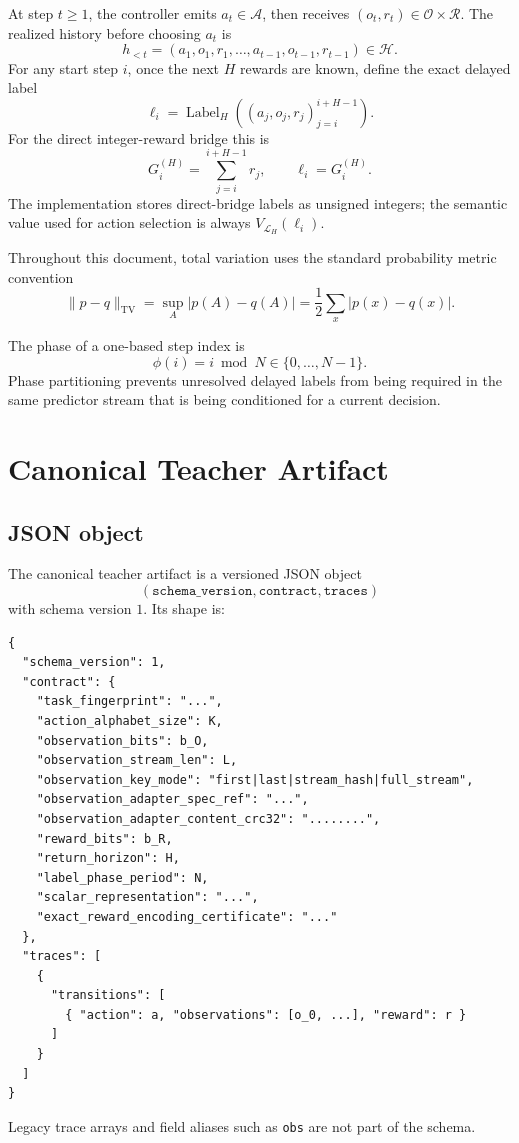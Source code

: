 \documentclass[11pt]{article}
\newcommand{\Act}{\mathcal{A}}
\newcommand{\Ospace}{\mathcal{O}}
\newcommand{\Rspace}{\mathcal{R}}
\newcommand{\Hist}{\mathcal{H}}
\newcommand{\TV}{\mathrm{TV}}
\newcommand{\Lab}{\mathcal{L}_H}
\newcommand{\Vlab}{V_{\Lab}}
\begin{document}
At step \(t\ge1\), the controller emits \(a_t\in\Act\), then receives
\((o_t,r_t)\in\Ospace\times\Rspace\). The realized history before choosing
\(a_t\) is
\[
h_{<t}=(a_1,o_1,r_1,\dots,a_{t-1},o_{t-1},r_{t-1})\in\Hist.
\]
For any start step \(i\), once the next \(H\) rewards are known, define the
exact delayed label
\[
\ell_i=\operatorname{Label}_H((a_j,o_j,r_j)_{j=i}^{i+H-1}).
\]
For the direct integer-reward bridge this is
\[
G_i^{(H)}=\sum_{j=i}^{i+H-1}r_j,
\qquad
\ell_i=G_i^{(H)}.
\]
The implementation stores direct-bridge labels as unsigned integers; the semantic value
used for action selection is always \(\Vlab(\ell_i)\).

Throughout this document, total variation uses the standard probability
metric convention
\[
\|p-q\|_{\TV}
=
\sup_A |p(A)-q(A)|
=
\frac12\sum_x |p(x)-q(x)|.
\]

The phase of a one-based step index is
\[
\phi(i)=i\bmod N\in\{0,\dots,N-1\}.
\]
Phase partitioning prevents unresolved delayed labels from being required in
the same predictor stream that is being conditioned for a current decision.

\section{Canonical Teacher Artifact}
\label{sec:teacher-artifact}

\subsection{JSON object}

The canonical teacher artifact is a versioned JSON object
\[
(\texttt{schema\_version},\texttt{contract},\texttt{traces})
\]
with schema version \(1\). Its shape is:
\begin{verbatim}
{
  "schema_version": 1,
  "contract": {
    "task_fingerprint": "...",
    "action_alphabet_size": K,
    "observation_bits": b_O,
    "observation_stream_len": L,
    "observation_key_mode": "first|last|stream_hash|full_stream",
    "observation_adapter_spec_ref": "...",
    "observation_adapter_content_crc32": "........",
    "reward_bits": b_R,
    "return_horizon": H,
    "label_phase_period": N,
    "scalar_representation": "...",
    "exact_reward_encoding_certificate": "..."
  },
  "traces": [
    {
      "transitions": [
        { "action": a, "observations": [o_0, ...], "reward": r }
      ]
    }
  ]
}
\end{verbatim}
Legacy trace arrays and field aliases such as \texttt{obs} are not part of
the schema.
\end{document}
